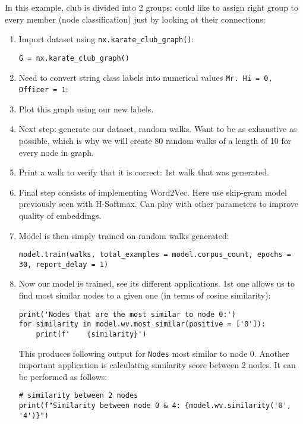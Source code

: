 \documentclass{article}
\begin{document}
\begin{itemize}
\begin{itemize}
        In this example, club is divided into 2 groups: could like to assign right group to every member (node classification) just by looking at their connections:
        \begin{enumerate}
            \item Import dataset using \verb|nx.karate_club_graph()|:
            \begin{verbatim}
G = nx.karate_club_graph()
            \end{verbatim}
            \item Need to convert string class labels into numerical values {\tt Mr. Hi = 0, Officer = 1}:
            \item Plot this graph using our new labels.
            \item Next step: generate our dataset, random walks. Want to be as exhaustive as possible, which is why we will create 80 random walks of a length of 10 for every node in graph.
            \item Print a walk to verify that it is correct: 1st walk that was generated.
            \item Final step consists of implementing Word2Vec. Here use skip-gram model previously seen with H-Softmax. Can play with other parameters to improve quality of embeddings.
            \item Model is then simply trained on random walks generated:
            \begin{verbatim}
model.train(walks, total_examples = model.corpus_count, epochs = 30, report_delay = 1)
            \end{verbatim}
            \item Now our model is trained, see its different applications. 1st one allows us to find most similar nodes to a given one (in terms of cosine similarity):
            \begin{verbatim}
print('Nodes that are the most similar to node 0:')
for similarity in model.wv.most_similar(positive = ['0']):
    print(f'	{similarity}')
            \end{verbatim}
            This produces following output for {\tt Nodes} most similar to node 0. Another important application is calculating similarity score between 2 nodes. It can be performed as follows:
            \begin{verbatim}
# similarity between 2 nodes
print(f"Similarity between node 0 & 4: {model.wv.similarity('0', '4')}")
            \end{verbatim}
        \end{enumerate}

\end{itemize}
\end{itemize}
\end{document}
